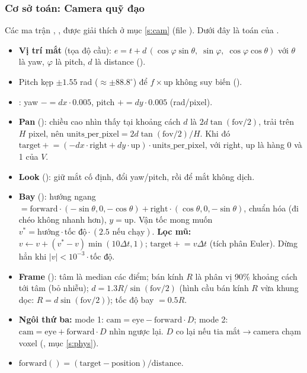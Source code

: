 \subsubsection{Cơ sở toán: Camera quỹ đạo}\label{s:cam-orbit}
Các ma trận , ,  được giải thích ở mục \ref{s:cam} (file ). Dưới đây là toán của .
\begin{itemize}
\item \textbf{Vị trí mắt} (tọa độ cầu): $e=t+d\,(\cos\varphi\sin\theta,\;\sin\varphi,\;\cos\varphi\cos\theta)$ với $\theta$ là yaw, $\varphi$ là pitch, $d$ là distance ().
\item Pitch kẹp $\pm1.55$ rad ($\approx\pm88.8^\circ$) để $f\times\mathrm{up}$ không suy biến ().
\item {}: yaw $-=dx\cdot0.005$, pitch $+=dy\cdot0.005$ (rad/pixel).
\item \textbf{Pan} (): chiều cao nhìn thấy tại khoảng cách $d$ là $2d\tan(\mathrm{fov}/2)$, trải trên $H$ pixel, nên $\mathrm{units\_per\_pixel}=2d\tan(\mathrm{fov}/2)/H$. Khi đó $\mathrm{target}\mathrel{+}=(-dx\cdot\mathrm{right}+dy\cdot\mathrm{up})\cdot\mathrm{units\_per\_pixel}$, với right, up là hàng 0 và 1 của $V$.
\item \textbf{Look} (): giữ mắt cố định, đổi yaw/pitch, rồi  để mắt không dịch.
\item \textbf{Bay} (): hướng ngang $=\mathrm{forward}\cdot(-\sin\theta,0,-\cos\theta)+\mathrm{right}\cdot(\cos\theta,0,-\sin\theta)$, chuẩn hóa (đi chéo không nhanh hơn), $y=\mathrm{up}$. Vận tốc mong muốn $v^*=\text{hướng}\cdot\text{tốc độ}\cdot(2.5\text{ nếu chạy})$. \textbf{Lọc mũ:} $v\leftarrow v+(v^*-v)\min(10\Delta t,1)$; $\mathrm{target}\mathrel{+}=v\Delta t$ (tích phân Euler). Dừng hẳn khi $|v|<10^{-3}\cdot\text{tốc độ}$.
\item \textbf{Frame} (): tâm là median các điểm; bán kính $R$ là phân vị 90\% khoảng cách tới tâm (bỏ nhiễu); $d=1.3R/\sin(\mathrm{fov}/2)$ (hình cầu bán kính $R$ vừa khung dọc: $R=d\sin(\mathrm{fov}/2)$); tốc độ bay $=0.5R$.
\item \textbf{Ngôi thứ ba:} mode 1: $\mathrm{cam}=\mathrm{eye}-\mathrm{forward}\cdot D$; mode 2: $\mathrm{cam}=\mathrm{eye}+\mathrm{forward}\cdot D$ nhìn ngược lại. $D$ co lại nếu tia mắt$\to$camera chạm voxel (, mục \ref{s:phys}).
\item $\mathrm{forward}()=(\mathrm{target}-\mathrm{position})/\mathrm{distance}$.
\end{itemize}
